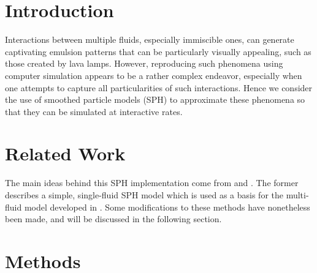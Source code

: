 \documentclass[acmtog,review]{acmart}
\begin{document}

%
%


\maketitle

\section{Introduction}
Interactions between multiple fluids, especially immiscible ones, can generate captivating emulsion patterns that can be particularly visually appealing, such as those created by lava lamps. However, reproducing such phenomena using computer simulation appears to be a rather complex endeavor, especially when one attempts to capture all particularities of such interactions. Hence we consider the use of smoothed particle models (SPH) to approximate these phenomena so that they can be simulated at interactive rates. 

\section{Related Work}
The main ideas behind this SPH implementation come from \cite{muller3} and \cite{muller5}. The former describes a simple, single-fluid SPH model which is used as a basis for the multi-fluid model developed in \cite{muller5}. Some modifications to these methods have nonetheless been made, and will be discussed in the following section.

\section{Methods}
\end{document}
